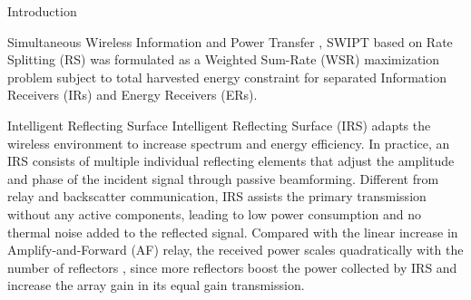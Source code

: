 \documentclass{IEEEtran}
\begin{document}
\begin{section}{Introduction}
\begin{subsection}{Simultaneous Wireless Information and Power Transfer}
\cite{Mao2019}, SWIPT based on Rate Splitting (RS) was formulated as a Weighted Sum-Rate (WSR) maximization problem subject to total harvested energy constraint for separated Information Receivers (IRs) and Energy Receivers (ERs).
	\end{subsection}

	\begin{subsection}{Intelligent Reflecting Surface}
		Intelligent Reflecting Surface (IRS) adapts the wireless environment to increase spectrum and energy efficiency. In practice, an IRS consists of multiple individual reflecting elements that adjust the amplitude and phase of the incident signal through passive beamforming. Different from relay and backscatter communication, IRS assists the primary transmission without any active components, leading to low power consumption and no thermal noise added to the reflected signal. Compared with the linear increase in Amplify-and-Forward (AF) relay, the received power scales quadratically with the number of reflectors \cite{Wu2019}, since more reflectors boost the power collected by IRS and increase the array gain in its equal gain transmission.


\end{subsection}
\end{section}
\end{document}
